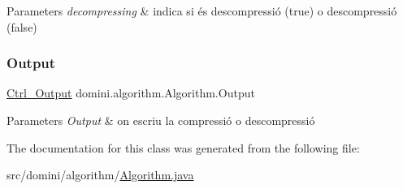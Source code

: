 \begin{DoxyParams}{Parameters}
{\em decompressing} & indica si és descompressió (true) o descompressió (false) \\
\hline
\end{DoxyParams}
\mbox{\label{classdomini_1_1algorithm_1_1Algorithm_a4de9955411c656325adc391ef570c082}} 
\subsubsection{\texorpdfstring{Output}{Output}}
{\footnotesize\ttfamily \hyperlink{classpersistencia_1_1output_1_1Ctrl__Output}{Ctrl\+\_\+\+Output} domini.\+algorithm.\+Algorithm.\+Output\hspace{0.3cm}{\ttfamily [protected]}}


\begin{DoxyParams}{Parameters}
{\em Output} & on escriu la compressió o descompressió \\
\hline
\end{DoxyParams}


The documentation for this class was generated from the following file\+:\begin{DoxyCompactItemize}
\item 
src/domini/algorithm/\hyperlink{Algorithm_8java}{Algorithm.\+java}\end{DoxyCompactItemize}
